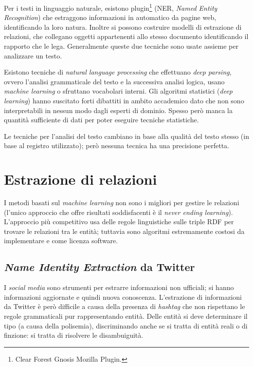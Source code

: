 \documentclass[11pt]{article}
\begin{document}
Per i testi in linguaggio naturale, esistono plugin\footnote{Clear Forest Gnosis Mozilla Plugin.} (NER, \textit{Named Entity Recognition}) che estraggono informazioni in automatico da pagine web, identificando la loro natura.
Inoltre si possono costruire modelli di estrazione di relazioni, che collegano oggetti appartenenti allo stesso documento identificando il rapporto che le lega.
Generalmente queste due tecniche sono usate assieme per analizzare un testo.

Esistono tecniche di \textit{natural language processing} che effettuano \textit{deep parsing}, ovvero l'analisi grammaticale del testo e la successiva analisi logica, usano \textit{machine learning} o sfruttano vocabolari interni.
Gli algoritmi statistici (\textit{deep learning}) hanno suscitato forti dibattiti in ambito accademico dato che non sono interpretabili in nessun modo dagli esperti di dominio.
Spesso però manca la quantità sufficiente di dati per poter eseguire tecniche statistiche.

Le tecniche per l'analisi del testo cambiano in base alla qualità del testo stesso (in base al registro utilizzato); però nessuna tecnica ha una precisione perfetta.

\section{Estrazione di relazioni}
I metodi basati sul \textit{machine learning} non sono i migliori per gestire le relazioni (l'unico approccio che offre risultati soddisfacenti è il \textit{never ending learning}).
L'approccio più competitivo usa delle regole linguistiche sulle triple RDF per trovare le relazioni tra le entità; tuttavia sono algoritmi estremamente costosi da implementare e come licenza software.

\subsection{\textit{Name Identity Extraction} da Twitter}
I \textit{social media} sono strumenti per estrarre informazioni non ufficiali; si hanno informazioni aggiornate e quindi nuova conoscenza.
L'estrazione di informazioni da Twitter è però difficile a causa della presenza di \textit{hashtag} che non rispettano le regole grammaticali pur rappresentando entità.
Delle entità si deve determinare il tipo (a causa della polisemia), discriminando anche se si tratta di entità reali o di finzione: si tratta di risolvere le disambuiguità.
\end{document}
